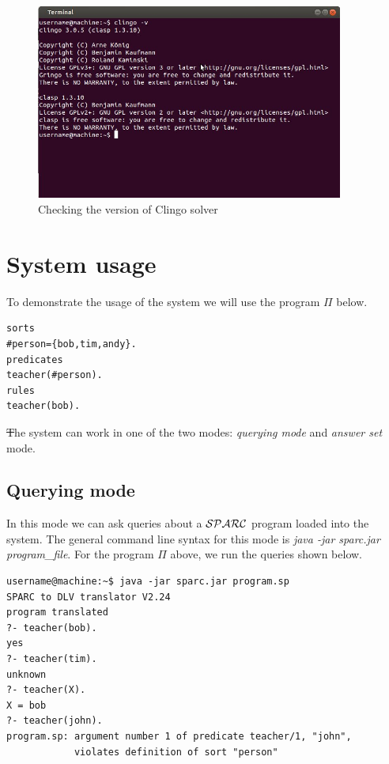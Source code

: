 \documentclass[12pt, letterpaper]{article}
\begin{document}
\begin{figure}[p]
\centering
\includegraphics[width=0.9\textwidth]{clingo_version.jpg}
\caption{Checking the version of Clingo solver}
\label{fig:clingo_solver_check}
\end{figure}

\section{System usage}

To demonstrate the usage of the system we will use the program $\Pi$ below.
\begin{verbatim}
sorts
#person={bob,tim,andy}.
predicates
teacher(#person).
rules
teacher(bob).
\end{verbatim}

\st
The system can work in one of the  two modes: \textit{querying mode} and \textit{answer set} mode.

\subsection{Querying mode}

In this mode we can ask queries about a ${\cal SPARC}$ program loaded into the system.
The general command line syntax for this mode is \textit{java -jar sparc.jar program\_file}.
For the program $\Pi$ above, we run the queries shown below. 

\begin{verbatim}
username@machine:~$ java -jar sparc.jar program.sp
SPARC to DLV translator V2.24
program translated
?- teacher(bob).
yes
?- teacher(tim).
unknown
?- teacher(X).
X = bob
?- teacher(john).
program.sp: argument number 1 of predicate teacher/1, "john", 
            violates definition of sort "person"

\end{verbatim}
\end{document}
